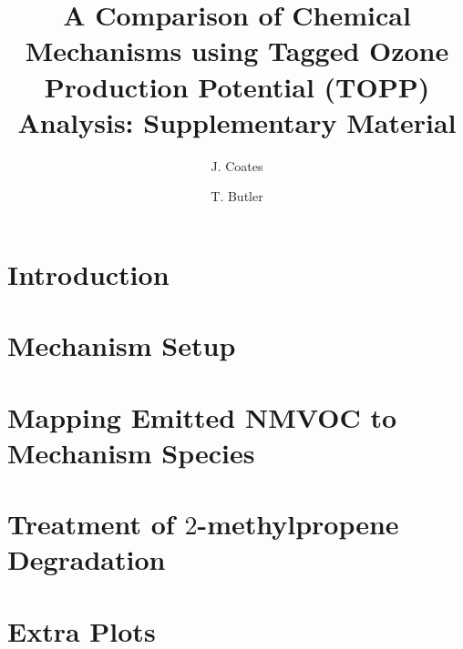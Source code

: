 \documentclass[11pt,a4paper]{article}
\title{A Comparison of Chemical Mechanisms using Tagged Ozone Production Potential (TOPP) Analysis: Supplementary Material}
\author[1]{J. Coates}%
\author[1]{T. Butler}
\affil[1]{Institute for Advanced Sustainability Studies, Potsdam, Germany}
\begin{document}
\maketitle
%
\section{Introduction} \label{s:introduction}

%
\section{Mechanism Setup} \label{s:mechanism}

%
\section{Mapping Emitted NMVOC to Mechanism Species}

%
\section{Treatment of $2$-methylpropene Degradation}

%
\section{Extra Plots} \label{s:extra_plots}

%

 
\end{document}

